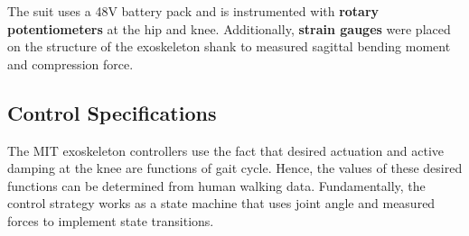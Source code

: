 The suit uses a 48V battery pack and is instrumented with \textbf{rotary potentiometers} at the hip and knee.  Additionally, \textbf{strain gauges} were placed on the structure of the exoskeleton shank to measured sagittal bending moment and compression force.
 
 
 \subsection{Control Specifications}
 
The MIT exoskeleton controllers use the fact that desired actuation and active damping at the knee are functions of gait cycle.  Hence, the values of these desired functions can be determined from human walking data.  Fundamentally, the control strategy works as a state machine that uses joint angle and measured forces to implement state transitions.

